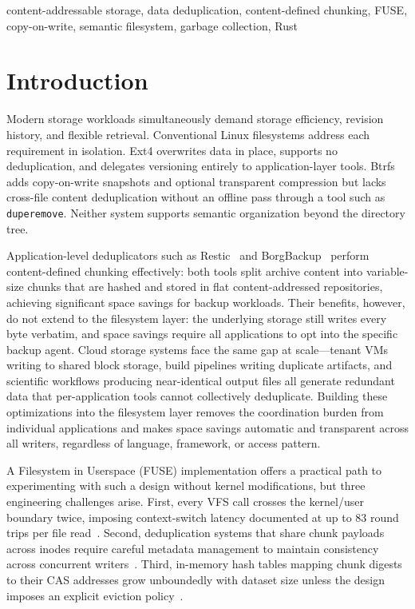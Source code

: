 \documentclass[journal]{IEEEtran}
\begin{document}
\begin{IEEEkeywords}
content-addressable storage, data deduplication, content-defined
chunking, FUSE, copy-on-write, semantic filesystem, garbage collection,
Rust
\end{IEEEkeywords}

\section{Introduction}

Modern storage workloads simultaneously demand storage efficiency,
revision history, and flexible retrieval. Conventional Linux filesystems
address each requirement in isolation. Ext4 overwrites data in place,
supports no deduplication, and delegates versioning entirely to
application-layer tools. Btrfs adds copy-on-write snapshots and optional
transparent compression but lacks cross-file content deduplication
without an offline pass through a tool such as \texttt{duperemove}.
Neither system supports semantic organization beyond the directory tree.

Application-level deduplicators such as Restic~\cite{restic2024} and
BorgBackup~\cite{borgbackup2024} perform content-defined chunking
effectively: both tools split archive content into variable-size
chunks that are hashed and stored in flat content-addressed
repositories, achieving significant space savings for backup
workloads. Their benefits, however, do not extend to the filesystem
layer: the underlying storage still writes every byte verbatim, and
space savings require all applications to opt into the specific backup
agent. Cloud storage systems face the same gap at scale---tenant VMs
writing to shared block storage, build pipelines writing duplicate
artifacts, and scientific workflows producing near-identical output
files all generate redundant data that per-application tools cannot
collectively deduplicate. Building these optimizations into the
filesystem layer removes the coordination burden from individual
applications and makes space savings automatic and transparent across
all writers, regardless of language, framework, or access pattern.

A Filesystem in Userspace (FUSE) implementation offers a practical path
to experimenting with such a design without kernel modifications, but
three engineering challenges arise. First, every VFS call crosses the
kernel/user boundary twice, imposing context-switch latency documented at
up to 83 round trips per file read~\cite{vangoor2017fuse}. Second,
deduplication systems that share chunk payloads across inodes require
careful metadata management to maintain consistency across concurrent
writers~\cite{soules2003metadata}. Third, in-memory hash tables mapping
chunk digests to their CAS addresses grow unboundedly with dataset size
unless the design imposes an explicit eviction policy~\cite{zhu2008dedup}.
\end{document}
